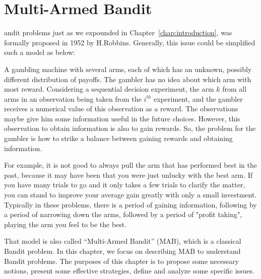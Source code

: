 %
%
\let\textcircled=\pgftextcircled
\chapter{Multi-Armed Bandit}
\label{chap:MAB}

andit problems just as we expounded in Chapter~\ref{chap:introduction}, was formally proposed in 1952 by H.Robbins. Generally, this issue could be simplified such a model as below:

A gambling machine with several arms, each of which has an unknown, possibly different distribution of payoffs. The gambler has no idea about which arm with most reward. Considering a sequential decision experiment, the arm $k$ from all arms in an observation being taken from the $i^{th}$ experiment, and the gambler receives a numerical value of this observation as a reward. The observations maybe give him some information useful in the future choices. However,  this observation to obtain information is also to gain rewards. So, the problem for the gambler is how to strike a balance between gaining rewards and obtaining information. 

For example, it is not good to always pull the arm that has performed best in the past, because it may have been that you were just unlucky with the best arm. If you have many trials to go and it only takes a few trials to clarify the matter, you can stand to improve your average gain greatly with only a small investment. Typically in these problems, there is a period of gaining information, following by a period of narrowing down the arms, followed by a period of "profit taking", playing the arm you feel to be the best.

That model is also called ``Multi-Armed Bandit'' (MAB), which is a classical Bandit problem. In this chapter, we focus on describing MAB to understand Bandit problems. The purposes of this chapter is to propose some necessary notions, present some effective strategies,  define and analyze some specific issues. 


\
\
\
\
\
\












